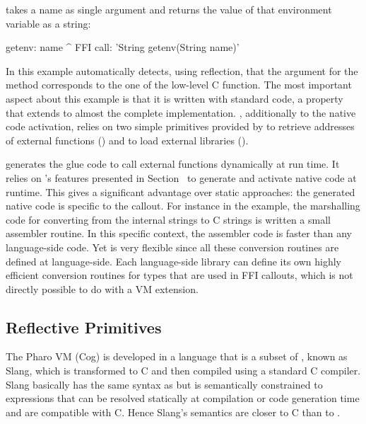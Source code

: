  takes a name as single argument and returns the value of that environment variable as a string:
%
\begin{stcode}{4}
getenv: name
    ^ FFI call: 'String getenv(String name)'
\end{stcode}
%
In this example \NB automatically detects, using reflection, that the argument for the \PH method corresponds to the one of the low-level C function.
The most important aspect about this example is that it is written with standard \ST code, a property that extends to almost the complete implementation.
\NB, additionally to the native code activation, relies on two simple primitives provided by \B to retrieve addresses of external functions () and to load external libraries ().

\NB generates the glue code to call external functions dynamically at run time.
It relies on \B's features presented in Section~ to generate and activate native code at runtime.
This gives \NB a significant advantage over static approaches: the generated native code is specific to the callout.
For instance in the  example, the marshalling code for converting from the internal \PH strings to C strings is written a small assembler routine.
In this specific context, the assembler code is faster than any language-side code.
Yet \NB is very flexible since all these conversion routines are defined at language-side. 
Each language-side library can define its own highly efficient conversion routines for types that are used in FFI callouts, which is not directly possible to do with a VM extension.


\subsection{Reflective Primitives}
The Pharo VM (Cog) is developed in a language that is a subset of \ST, known as Slang, which is transformed to C and then compiled using a standard C compiler.  
Slang basically has the same syntax as \ST but is semantically constrained to expressions that can be resolved statically at compilation or code generation time and are compatible with C.
Hence Slang's semantics are closer to C than to \ST. 

